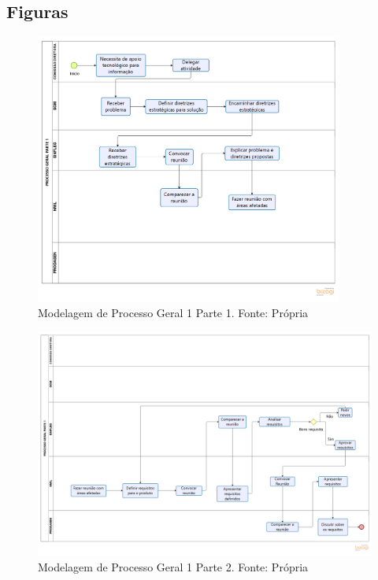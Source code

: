 \begin{apendicesenv}
    \partapendices

    \chapter{Figuras}
    \label{ch:figuras}

    \begin{figure}[H]
        \centering
        \includegraphics[width=0.9\textwidth]{figuras/modelagemProcessoGeralParte1.png}
        \caption{Modelagem de Processo Geral 1 Parte 1. Fonte: Própria}
        \label{img:modelagemProcessoGeral1Parte1}
    \end{figure}

    \begin{landscape}
        \begin{figure}[H]
            \centering
            \includegraphics[width=1.3\textwidth]{figuras/modelagemProcessoGeralParte2.png}
            \caption{Modelagem de Processo Geral 1 Parte 2. Fonte: Própria}
            \label{img:modelagemProcessoGeral1Parte2}
        \end{figure}
    \end{landscape}


\end{apendicesenv}
